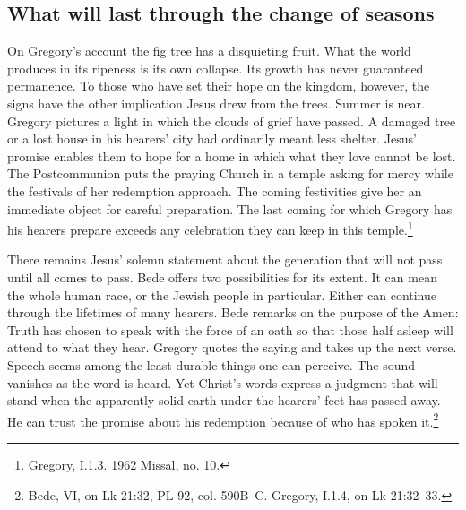 \subsection{What will last through the change of seasons}

On Gregory's account the fig tree has a disquieting fruit. What the world produces in its ripeness is its own collapse. Its growth has never guaranteed permanence. To those who have set their hope on the kingdom, however, the signs have the other implication Jesus drew from the trees. Summer is near. Gregory pictures a light in which the clouds of grief have passed. A damaged tree or a lost house in his hearers' city had ordinarily meant less shelter. Jesus' promise enables them to hope for a home in which what they love cannot be lost. The Postcommunion puts the praying Church in a temple asking for mercy while the festivals of her redemption approach. The coming festivities give her an immediate object for careful preparation. The last coming for which Gregory has his hearers prepare exceeds any celebration they can keep in this temple.\footnote{Gregory,  I.1.3. 1962 Missal, no. 10.}

There remains Jesus' solemn statement about the generation that will not pass until all comes to pass. Bede offers two possibilities for its extent. It can mean the whole human race, or the Jewish people in particular. Either can continue through the lifetimes of many hearers. Bede remarks on the purpose of the Amen: Truth has chosen to speak with the force of an oath so that those half asleep will attend to what they hear. Gregory quotes the saying and takes up the next verse. Speech seems among the least durable things one can perceive. The sound vanishes as the word is heard. Yet Christ's words express a judgment that will stand when the apparently solid earth under the hearers' feet has passed away. He can trust the promise about his redemption because of who has spoken it.\footnote{Bede,  VI, on Lk 21:32, PL 92, col. 590B--C. Gregory,  I.1.4, on Lk 21:32--33.}

